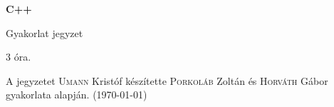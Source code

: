 \documentclass[a4paper,11.5pt,table]{article}
\begin{document}
	\setlength\parindent{0pt}
	\def\<{<\hspace{0mm}<}
	
	\theoremstyle{definition}
	\newtheorem{note}{Megjegyzés}[subsection]
  \newtheorem{example}{Példa}[subsection]
  \newtheorem{definition}{Definíció}[subsection]

	
	\begin{center}
		{\LARGE\textbf{C++}}
		
		{\Large Gyakorlat jegyzet}
		
		3 óra.
	\end{center}
	A jegyzetet \textsc{Umann} Kristóf készítette \textsc{Porkoláb} Zoltán és \textsc{Horváth} Gábor gyakorlata alapján. (\today)
%
%	
%	
%	
%	
%	
\end{document}
